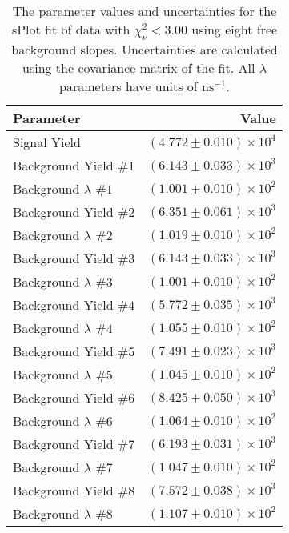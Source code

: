 
\begin{table}[ht]
    \begin{center}
        \begin{tabular}{lr}\toprule
            Parameter & Value \\\midrule
            Signal Yield & $(4.772 \pm 0.010) \times 10^{4}$ \\
            Background Yield $\#1$ & $(6.143 \pm 0.033) \times 10^{3}$ \\
            Background $\lambda$ $\#1$ & $(1.001 \pm 0.010) \times 10^{2}$ \\
            Background Yield $\#2$ & $(6.351 \pm 0.061) \times 10^{3}$ \\
            Background $\lambda$ $\#2$ & $(1.019 \pm 0.010) \times 10^{2}$ \\
            Background Yield $\#3$ & $(6.143 \pm 0.033) \times 10^{3}$ \\
            Background $\lambda$ $\#3$ & $(1.001 \pm 0.010) \times 10^{2}$ \\
            Background Yield $\#4$ & $(5.772 \pm 0.035) \times 10^{3}$ \\
            Background $\lambda$ $\#4$ & $(1.055 \pm 0.010) \times 10^{2}$ \\
            Background Yield $\#5$ & $(7.491 \pm 0.023) \times 10^{3}$ \\
            Background $\lambda$ $\#5$ & $(1.045 \pm 0.010) \times 10^{2}$ \\
            Background Yield $\#6$ & $(8.425 \pm 0.050) \times 10^{3}$ \\
            Background $\lambda$ $\#6$ & $(1.064 \pm 0.010) \times 10^{2}$ \\
            Background Yield $\#7$ & $(6.193 \pm 0.031) \times 10^{3}$ \\
            Background $\lambda$ $\#7$ & $(1.047 \pm 0.010) \times 10^{2}$ \\
            Background Yield $\#8$ & $(7.572 \pm 0.038) \times 10^{3}$ \\
            Background $\lambda$ $\#8$ & $(1.107 \pm 0.010) \times 10^{2}$ \\\bottomrule
        \end{tabular}
        \caption{The parameter values and uncertainties for the sPlot fit of data with $\chi^2_\nu < 3.00$ using eight free background slopes. Uncertainties are calculated using the covariance matrix of the fit. All $\lambda$ parameters have units of $\si{\nano\second}^{-1}$.}\label{tab:splot-fit-results-chisqdof-3.00-free-8}
    \end{center}
\end{table}
